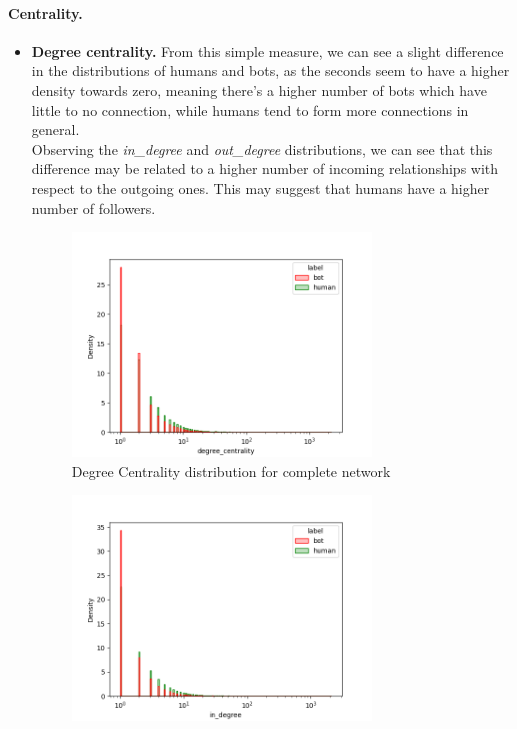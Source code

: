 \documentclass[12pt, a4paper]{article}
\begin{document}
    	\paragraph{Centrality.}
		\begin{itemize}
			\item \textbf{Degree centrality.} From this simple measure, we can see a slight difference in the distributions of humans and bots, as the seconds seem to have a higher density towards zero, meaning there's a higher number of bots which have little to no connection, while humans tend to form more connections in general.\\
                Observing the \textit{in\_degree} and \textit{out\_degree} distributions, we can see that this difference may be related to a higher number of incoming relationships with respect to the outgoing ones. This may suggest that humans have a higher number of followers. 
                \begin{figure}[H]
                	\centering
                    \includegraphics[width=0.75\textwidth]{complete_degree_centrality.png}
                    \caption{Degree Centrality distribution for complete network}
                \end{figure}
                \begin{figure}[H]
                    \centering
                    \includegraphics[width=0.75\textwidth]{complete_in_degree.png}

\end{figure}
\end{itemize}
\end{document}
